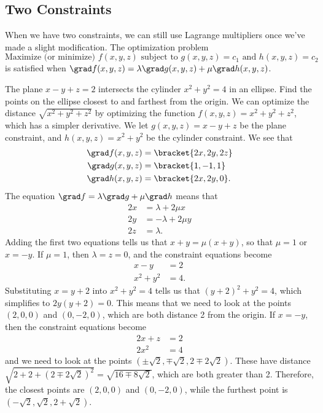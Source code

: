 \subsection{Two Constraints}

When we have two constraints, we can still use Lagrange multipliers once we've made a slight modification.  The optimization problem
\[
 \text{Maximize (or minimize) }f(x,y,z)\text{ subject to }
 g(x,y,z)=c_1\text{ and }h(x,y,z)=c_2
\]
is satisfied when $\grad f(x,y,z)=\lambda\grad g(x,y,z)+\mu\grad h(x,y,z)$.

\begin{example}\label{ex_lang_two_const}
The plane $x-y+z=2$ intersects the cylinder $x^2+y^2=4$ in an ellipse. Find the points on the ellipse closest to and farthest from the origin.
\solution
We can optimize the distance $\sqrt{x^2+y^2+z^2}$ by optimizing the function $f(x,y,z)=x^2+y^2+z^2$, which has a simpler derivative.  We let $g(x,y,z)=x-y+z$ be the plane constraint, and $h(x,y,z)=x^2+y^2$ be the cylinder constraint.  We see that
\begin{align*}
 \grad f(x,y,z)&=\bracket{2x,2y,2z} \\
 \grad g(x,y,z)&=\bracket{1,-1,1} \\
 \grad h(x,y,z)&=\bracket{2x,2y,0}.
\end{align*}
The equation $\grad f=\lambda\grad g+\mu\grad h$ means that 
\begin{align*}
 2x&=\lambda+2\mu x\\
 2y&=-\lambda+2\mu y\\
 2z&=\lambda.
\end{align*}
Adding the first two equations tells us that $x+y=\mu(x+y)$, so that $\mu=1$ or $x=-y$.  If $\mu=1$, then $\lambda=z=0$, and the constraint equations become
\begin{align*}
 x-y&=2\\
 x^2+y^2&=4.
\end{align*}
Substituting $x=y+2$ into $x^2+y^2=4$ tells us that $(y+2)^2+y^2=4$,
which simplifies to $2y(y+2)=0$.  This means that we need to look at the points $(2,0,0)$ and $(0,-2,0)$, which are both distance 2 from the origin.  If $x=-y$, then the constraint equations become
\begin{align*}
 2x+z&=2\\
 2x^2&=4
\end{align*}
and we need to look at the points $(\pm\sqrt2,\mp\sqrt2,2\mp2\sqrt2)$.  These have distance
$\sqrt{2+2+(2\mp2\sqrt2)^2}
=\sqrt{16\mp8\sqrt2}$, which are both greater than 2.  Therefore, the closest points are $(2,0,0)$ and $(0,-2,0)$, while the furthest point is $(-\sqrt2,\sqrt2,2+\sqrt2)$.
\end{example}

